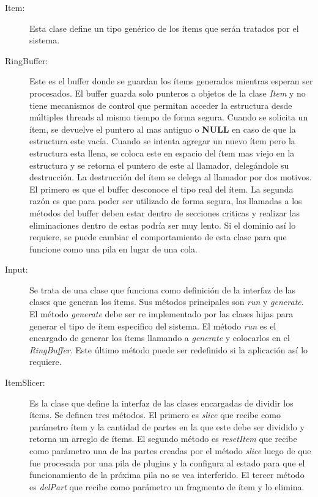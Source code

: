 \begin{description}

\item[Item:] Esta clase define un tipo genérico de los ítems que serán tratados
	por el sistema.

\item[RingBuffer:] Este es el buffer donde se guardan los ítems generados
	mientras esperan ser procesados. El buffer guarda solo punteros a
	objetos de la clase \emph{Item} y no tiene mecanismos de control que
	permitan acceder la estructura desde múltiples threads al mismo tiempo
	de forma segura. Cuando se solicita un ítem, se devuelve el puntero al
	mas antiguo o \textbf{NULL} en caso de que la estructura este vacía.
	Cuando se intenta agregar un nuevo ítem pero la estructura esta llena,
	se coloca este en espacio del ítem mas viejo en la estructura y se
	retorna el puntero de este al llamador, delegándole su destrucción. La
	destrucción del ítem se delega al llamador por dos motivos. El primero
	es que el buffer desconoce el tipo real del ítem. La segunda razón es
	que para poder ser utilizado de forma segura, las llamadas a los métodos
	del buffer deben estar dentro de secciones criticas y realizar las
	eliminaciones dentro de estas podría ser muy lento. Si el dominio así
	lo requiere, se puede cambiar el comportamiento de esta clase para que
	funcione como una pila en lugar de una cola.

\item[Input:] Se trata de una clase que funciona como definición de la interfaz
	de las clases que generan los ítems. Sus métodos principales son
	\emph{run} y \emph{generate}. El método \emph{generate} debe ser re
	implementado por las clases hijas para generar el tipo de ítem
	especifico del sistema. El método \emph{run} es el encargado de generar
	los ítems llamando a \emph{generate} y colocarlos en el
	\emph{RingBuffer}. Este último método puede ser redefinido si la
	aplicación así lo requiere.

\item[ItemSlicer:] Es la clase que define la interfaz de las clases encargadas
	de dividir los ítems. Se definen tres métodos. El primero es
	\emph{slice} que recibe como parámetro ítem y la cantidad de partes en
	la que este debe ser dividido y retorna un arreglo de ítems. El segundo
	método es \emph{resetItem} que recibe como parámetro una de las partes
	creadas por el método \emph{slice} luego de que fue procesada por una
	pila de plugins y la configura al estado para que el funcionamiento de
	la próxima pila no se vea interferido. El tercer método es
	\emph{delPart} que recibe como parámetro un fragmento de ítem y lo
	elimina.


\end{description}
